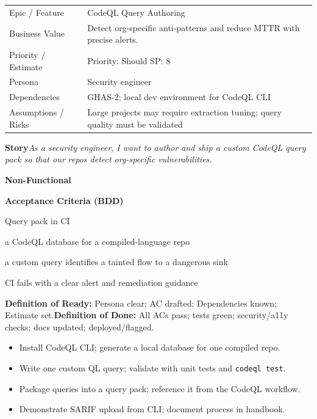 \documentclass[11pt,a4paper]{article}
\newcommand{\cb}{\(\square\)}
\newenvironment{GHASCard}[2]{%
  \begin{tcolorbox}[ghascard,title={\ghasheader{#1 --- #2}}]
  \small
}{%
  \end{tcolorbox}
}
\newenvironment{GHASTasks}{%
  \begin{tcolorbox}[ghastasks]
  \small
  \begin{itemize}[label=\cb, leftmargin=*, labelsep=0.6em]
}{%
  \end{itemize}
  \end{tcolorbox}
}
\newcommand{\DoR}{\textbf{Definition of Ready:} Persona clear; AC drafted; Dependencies known; Estimate set.}
\newcommand{\DoD}{\textbf{Definition of Done:} All ACs pass; tests green; security/a11y checks; docs updated; deployed/flagged.}
\begin{document}
\begin{GHASCard}{GHAS-3}{CodeQL Deep Dive: CLI, Databases, Custom Queries}
\begin{tabularx}{\linewidth}{L V}
Epic / Feature & CodeQL Query Authoring \tabularnewline
Business Value & Detect org-specific anti-patterns and reduce MTTR with precise alerts. \tabularnewline
Priority / Estimate & Priority: Should \quad SP: 8 \tabularnewline
Persona & Security engineer \tabularnewline
Dependencies & GHAS-2; local dev environment for CodeQL CLI \tabularnewline
Assumptions / Risks & Large projects may require extraction tuning; query quality must be validated \tabularnewline
\end{tabularx}

\medskip
\textbf{Story}\quad \emph{As a security engineer, I want to author and ship a custom CodeQL query pack so that our repos detect org-specific vulnerabilities.}

\medskip
\textbf{Non-Functional}\quad
{}\ \ 

\medskip
\textbf{Acceptance Criteria (BDD)}
\begin{description}[leftmargin=2.7cm, labelwidth=2.6cm, style=nextline]
  \item[\textbf{Scenario}] Query pack in CI
  \item[\textbf{Given}] a CodeQL database for a compiled-language repo
  \item[\textbf{When}] a custom query identifies a tainted flow to a dangerous sink
  \item[\textbf{Then}] CI fails with a clear alert and remediation guidance
\end{description}

\medskip
\DoR\quad\textbullet\quad\DoD
\end{GHASCard}

\begin{GHASTasks}
\item Install CodeQL CLI; generate a local database for one compiled repo.
\item Write one custom QL query; validate with unit tests and \texttt{codeql test}.
\item Package queries into a query pack; reference it from the CodeQL workflow.
\item Demonstrate SARIF upload from CLI; document process in handbook.
\end{GHASTasks}
\clearpage
\end{document}
